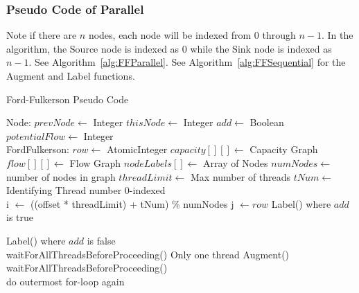     \subsubsection{Pseudo Code of Parallel}
        Note if there are $n$ nodes, each node will be indexed from 0 through $n-1$. In the algorithm, the Source node is indexed as 0 while the Sink node is indexed as $n-1$. See Algorithm~\ref{alg:FFParallel}. See Algorithm~\ref{alg:FFSequential} for the Augment and Label functions.
        \begin{algorithm}
            \caption{Ford-Fulkerson Pseudo Code}
            \label{alg:FFParallel}
            \begin{algorithmic}[1]
                \State Node:
                    \State $prevNode \gets$ Integer
                    \State $thisNode \gets$ Integer
                    \State $add \gets$ Boolean
                    \State $potentialFlow \gets$ Integer\\
                    
                \State FordFulkerson:
                    \State $row \gets$ AtomicInteger
                    \State $capacity[][] \gets$ Capacity Graph
                    \State $flow[][] \gets$ Flow Graph
                    \State $nodeLabels[] \gets$ Array of Nodes
                    \State $numNodes \gets$ number of nodes in graph
                    \State $threadLimit \gets$ Max number of threads
                    \State $tNum \gets$ Identifying Thread number 0-indexed
                    \\
                    
                        \State i $\gets$ ((offset * threadLimit) + tNum) \% numNodes
                            \State j $\gets row$
                                \State
                                        Label() where $add$ is true
                                    \EndIf
                                    
                                        Label() where $add$ is false
                                    \EndIf
                            \EndIf\\
                            waitForAllThreadsBeforeProceeding()
                        \EndFor
                            Only one thread Augment()\\
                            waitForAllThreadsBeforeProceeding()\\
                            do outermost for-loop again
                        \EndIf\\
                    \EndFor\\
            \end{algorithmic}\\
        \end{algorithm}

